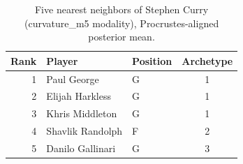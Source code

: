 \begin{table}[htbp]
  \centering\small
  \begin{tabular}{rllc}
    \toprule
    Rank & Player & Position & Archetype \\
    \midrule
    1 & Paul George & G & 1 \\
    2 & Elijah Harkless & G & 1 \\
    3 & Khris Middleton & G & 1 \\
    4 & Shavlik Randolph & F & 2 \\
    5 & Danilo Gallinari & G & 3 \\
    \bottomrule
  \end{tabular}
  \caption{Five nearest neighbors of Stephen Curry (curvature_m5 modality), Procrustes-aligned posterior mean.}
  \label{tab:Stephen_Curry_neighbors_curvature_m5}
\end{table}

